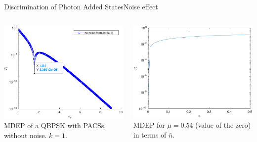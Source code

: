 \begin{frame}{Discrimination of Photon Added States}{Noise effect}
    \begin{columns}
        \begin{column}{0.5\linewidth}
            \begin{center}
                \includegraphics[width = 1\linewidth]{Pictures/fig3.2a.pdf}\\
                \scriptsize{
                    MDEP of a QBPSK with PACSs, without noise. $k=1$. 
                }
            \end{center}
        \end{column}
        \begin{column}{0.5\linewidth}
            \begin{center}
                \includegraphics[width = 1\linewidth]{Pictures/fig3.3a.pdf}\\
                \scriptsize{
                    MDEP for $\mu=0.54$ (value of the zero) in terms of $\bar{n}$. 
                }
            \end{center}
        \end{column}
    \end{columns}
\end{frame}